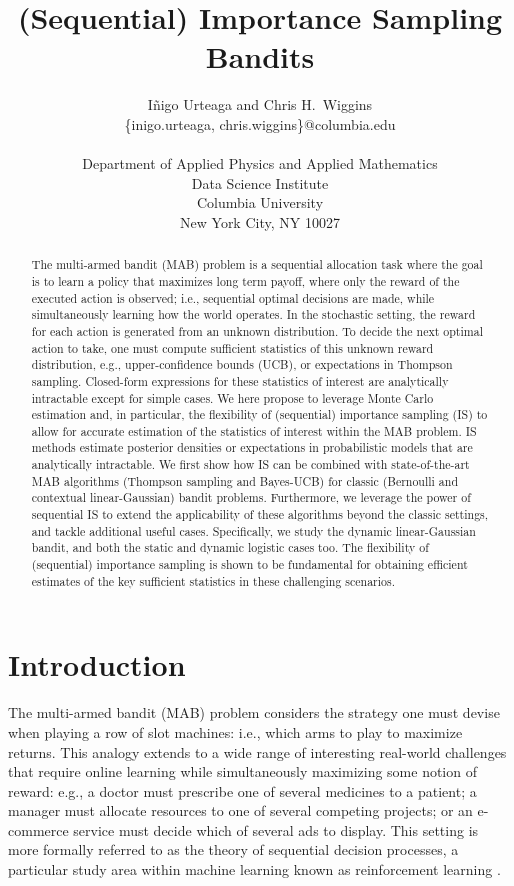 \documentclass{article}
\title{(Sequential) Importance Sampling Bandits}
\author{ I\~{n}igo Urteaga and Chris H.~Wiggins\\
	{\sf \{inigo.urteaga, chris.wiggins\}@columbia.edu} \\\\
	Department of	Applied Physics and Applied Mathematics\\
	Data Science Institute\\
	Columbia University\\
	New York City, NY 10027
}
\newcommand{\ie}{i.e., }
\newcommand{\eg}{e.g., }
\begin{document}
\maketitle


\begin{abstract}
The multi-armed bandit (MAB) problem is a sequential allocation task where the goal is to learn a policy that maximizes long term payoff, where only the reward of the executed action is observed; i.e., sequential optimal decisions are made, while simultaneously learning how the world operates. In the stochastic setting, the reward for each action is generated from an unknown distribution. To decide the next optimal action to take, one must compute sufficient statistics of 
this unknown reward distribution, \eg upper-confidence bounds (UCB), or expectations in Thompson sampling. Closed-form expressions for these statistics of interest are analytically intractable except for simple cases. We here propose to leverage Monte Carlo estimation and, in particular, the flexibility of (sequential) importance sampling (IS) to allow for accurate estimation of the statistics of interest within the MAB problem. IS methods estimate posterior densities or expectations in probabilistic models that are analytically intractable. We first show how IS can be combined with state-of-the-art MAB algorithms (Thompson sampling and Bayes-UCB) for classic (Bernoulli and contextual linear-Gaussian) bandit problems. Furthermore, we leverage the power of sequential IS to extend the applicability of these algorithms beyond the classic settings, and tackle additional useful cases. Specifically, we study the dynamic linear-Gaussian bandit, and both the static and dynamic logistic cases too. The flexibility of (sequential) importance sampling is shown to be fundamental for obtaining efficient estimates of the key sufficient statistics in these challenging scenarios.
\end{abstract}

\section{Introduction}
\label{intro}

The multi-armed bandit (MAB) problem considers the strategy one must devise when playing a row of slot machines: \ie which arms to play to maximize returns. This analogy extends to a wide range of interesting real-world challenges that require online learning while simultaneously maximizing some notion of reward: 
\eg a doctor must prescribe one of several medicines to a patient; a manager must allocate resources to one of several competing projects; or
an e-commerce service must decide which of several ads to display. 
This setting is more formally referred to as the theory of sequential decision processes, a particular study area within machine learning known as reinforcement learning \cite{b-Sutton1998}.
\end{document}
